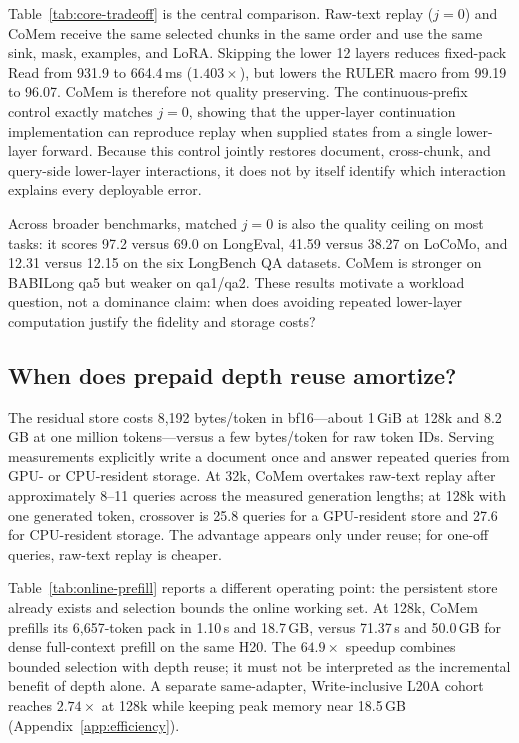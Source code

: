 Table~\ref{tab:core-tradeoff} is the central comparison. Raw-text replay
($j{=}0$) and CoMem receive the same selected chunks in the same order and use
the same sink, mask, examples, and LoRA. Skipping the lower 12 layers reduces
fixed-pack Read from 931.9 to 664.4\,ms ($1.403\times$), but lowers the RULER
macro from 99.19 to 96.07. CoMem is therefore not quality preserving. The
continuous-prefix control exactly matches $j{=}0$, showing that the upper-layer
continuation implementation can reproduce replay when supplied states from a
single lower-layer forward. Because this control jointly restores document,
cross-chunk, and query-side lower-layer interactions, it does not by itself
identify which interaction explains every deployable error.

Across broader benchmarks, matched $j{=}0$ is also the quality ceiling on most
tasks: it scores 97.2 versus 69.0 on LongEval, 41.59 versus 38.27 on LoCoMo,
and 12.31 versus 12.15 on the six LongBench QA datasets. CoMem is stronger on
BABILong qa5 but weaker on qa1/qa2. These results motivate a workload question,
not a dominance claim: when does avoiding repeated lower-layer computation
justify the fidelity and storage costs?

\subsection{When does prepaid depth reuse amortize?}
The residual store costs 8,192 bytes/token in bf16---about 1\,GiB at 128k and
8.2\,GB at one million tokens---versus a few bytes/token for raw token IDs.
Serving measurements explicitly write a document once and answer repeated
queries from GPU- or CPU-resident storage. At 32k, CoMem overtakes raw-text
replay after approximately 8--11 queries across the measured generation
lengths; at 128k with one generated token, crossover is 25.8 queries for a
GPU-resident store and 27.6 for CPU-resident storage. The advantage appears only
under reuse; for one-off queries, raw-text replay is cheaper.



Table~\ref{tab:online-prefill} reports a different operating point: the
persistent store already exists and selection bounds the online working set.
At 128k, CoMem prefills its 6,657-token pack in 1.10\,s and 18.7\,GB, versus
71.37\,s and 50.0\,GB for dense full-context prefill on the same H20. The
$64.9\times$ speedup combines bounded selection with depth reuse; it must not be
interpreted as the incremental benefit of depth alone. A separate same-adapter,
Write-inclusive L20A cohort reaches $2.74\times$ at 128k while keeping peak
memory near 18.5\,GB (Appendix~\ref{app:efficiency}).

